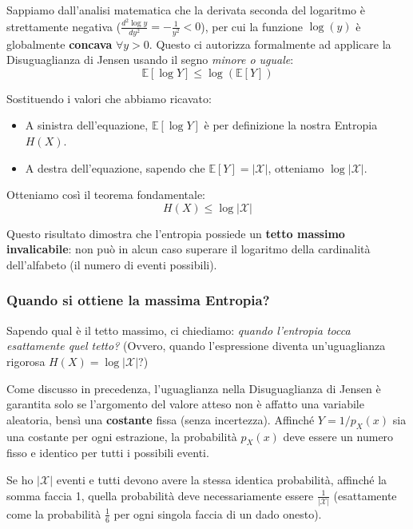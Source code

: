 Sappiamo dall'analisi matematica che la derivata seconda del logaritmo è strettamente negativa ($\frac{d^2 \log y}{dy^2} = -\frac{1}{y^2} < 0$), per cui la funzione $\log(y)$ è globalmente \textbf{concava} $\forall y > 0$.
Questo ci autorizza formalmente ad applicare la Disuguaglianza di Jensen usando il segno \textit{minore o uguale}:
\begin{equation}
\mathbb{E}[\log Y] \le \log(\mathbb{E}[Y])
\end{equation}

Sostituendo i valori che abbiamo ricavato:
\begin{itemize}
    \item A sinistra dell'equazione, $\mathbb{E}[\log Y]$ è per definizione la nostra Entropia $H(X)$.
    \item A destra dell'equazione, sapendo che $\mathbb{E}[Y] = |\mathcal{X}|$, otteniamo $\log|\mathcal{X}|$.
\end{itemize}

Otteniamo così il teorema fondamentale:
\begin{equation}
\boxed{ H(X) \le \log |\mathcal{X}| }
\end{equation}

Questo risultato dimostra che l'entropia possiede un \textbf{tetto massimo invalicabile}: non può in alcun caso superare il logaritmo della cardinalità dell'alfabeto (il numero di eventi possibili).

\subsubsection*{Quando si ottiene la massima Entropia?}

Sapendo qual è il tetto massimo, ci chiediamo: \textit{quando l'entropia tocca esattamente quel tetto?} (Ovvero, quando l'espressione diventa un'uguaglianza rigorosa $H(X) = \log|\mathcal{X}|$?)

Come discusso in precedenza, l'uguaglianza nella Disuguaglianza di Jensen è garantita solo se l'argomento del valore atteso non è affatto una variabile aleatoria, bensì una \textbf{costante} fissa (senza incertezza).
Affinché $Y = 1/p_X(x)$ sia una costante per ogni estrazione, la probabilità $p_X(x)$ deve essere un numero fisso e identico per tutti i possibili eventi. 

Se ho $|\mathcal{X}|$ eventi e tutti devono avere la stessa identica probabilità, affinché la somma faccia 1, quella probabilità deve necessariamente essere $\frac{1}{|\mathcal{X}|}$ (esattamente come la probabilità $\frac{1}{6}$ per ogni singola faccia di un dado onesto).

